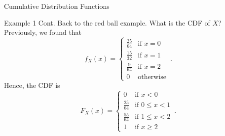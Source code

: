 \documentclass[10pt]{beamer}
\begin{document}
\begin{frame}[fragile]{Cumulative Distribution Functions}
\begin{exampleblock}{Example 1 Cont.}
Back to the red ball example. What is the CDF of \(X\)? Previously, we found that
\begin{equation*}
    f_X\left(x\right) =
    \begin{cases}
        \frac{25}{64} & \textrm{if } x = 0\\
        \frac{15}{32} & \textrm{if } x = 1\\
        \frac{9}{64} & \textrm{if } x = 2\\
        0 & \textrm{otherwise}
    \end{cases}\,.
\end{equation*}
Hence, the CDF is
\begin{equation*}
    F_X\left(x\right) =
    \begin{cases}
        0 & \textrm{if } x < 0\\
        \frac{25}{64} & \textrm{if } 0 \leq x < 1\\
        \frac{55}{64} & \textrm{if } 1 \leq x < 2\\
        1 & \textrm{if } x \geq 2
    \end{cases}\,.
\end{equation*}
\end{exampleblock}
\end{frame}
\end{document}
